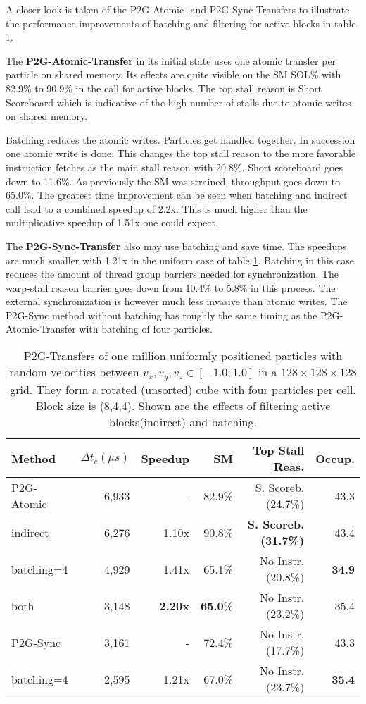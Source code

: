 \documentclass[m,times]{cgMA}
\begin{document}
A closer look is taken of the P2G-Atomic- and P2G-Sync-Transfers to illustrate the performance improvements of batching and filtering for active blocks in table \ref{table:p2g_optim}.

The \textbf{P2G-Atomic-Transfer} in its initial state uses one atomic transfer per particle on shared memory. Its effects are quite visible on the SM SOL\% with 82.9\% to 90.9\% in the call for active blocks. The top stall reason is Short Scoreboard which is indicative of the high number of stalls due to atomic writes on shared memory.

Batching reduces the atomic writes. Particles get handled together. In succession one atomic write is done. This changes the top stall reason to the more favorable instruction fetches as the main stall reason with 20.8\%. Short scoreboard goes down to 11.6\%. As previously the SM was strained, throughput goes down to 65.0\%. The greatest time improvement can be seen when batching and indirect call lead to a combined speedup of 2.2x. This is much higher than the multiplicative speedup of 1.51x one could expect.

The \textbf{P2G-Sync-Transfer} also may use batching and save time. The speedups are much smaller with 1.21x in the uniform case of table \ref{table:p2g_optim}. Batching in this case reduces the amount of thread group barriers needed for synchronization. The warp-stall reason barrier goes down from 10.4\% to 5.8\% in this process. The external synchronization is however much less invasive than atomic writes. The P2G-Sync method without batching has roughly the same timing as the P2G-Atomic-Transfer with batching of four particles.
\begin{table}[htpb]
  \begin{tabular}{ | l | r | r | r | r | r |}    \hline
    Method                 &  $\Delta t_c(\mu s)$ & Speedup &SM    & Top Stall Reas.  & Occup.\\\hline
    P2G-Atomic		   &    6,933             & -       &82.9\%&S. Scoreb.(24.7\%)& 43.3\\\hline
    indirect		   &    6,276             & 1.10x   &90.8\%&\textbf{S. Scoreb.(31.7\%)} & 43.4\\\hline
    batching=4           &    4,929             & 1.41x   &65.1\%&No Instr.(20.8\%)& \textbf{34.9}\\\hline
    both                   &    3,148             & \textbf{2.20x}   &\textbf{65.0}\%&No Instr.(23.2\%) & 35.4\\\hline
    \hline
    P2G-Sync     &    3,161             & -       &72.4\%&No Instr.(17.7\%) & 43.3\\\hline
    batching=4             &    2,595             & 1.21x   &67.0\%&No Instr.(23.7\%) & \textbf{35.4}\\\hline
 \end{tabular}
 \caption{P2G-Transfers of one million uniformly positioned particles with random velocities between $v_x,v_y,v_z \in [-1.0;1.0]$ in a $128\times 128\times128$ grid. They form a rotated (unsorted) cube with four particles per cell. Block size is (8,4,4). Shown are the effects of filtering active blocks(indirect) and batching.}\label{table:p2g_optim}
\end{table}
\end{document}
